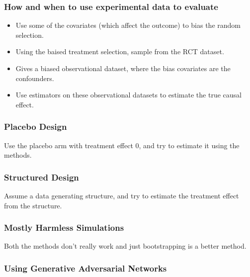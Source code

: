 \documentclass{beamer}
\begin{document}
\begin{frame}
	\frametitle{How and when to use experimental data to evaluate}
	\begin{itemize}
		\item Use some of the covariates (which affect the outcome) to bias the random
			selection.
		\item Using the baised treatment selection, sample from the RCT dataset.
		\item Gives a biased observational dataset, where the bias covariates are the 
			confounders.
		\item Use estimators on these observational datasets to estimate the true 
			causal effect.
	\end{itemize}
\end{frame}

\begin{frame}
	\frametitle{Placebo Design}
	Use the placebo arm with treatment effect 0, and try to estimate it using the methods.
\end{frame}

\begin{frame}
	\frametitle{Structured Design}
	Assume a data generating structure, and try to estimate the treatment effect from the structure.
\end{frame}

\begin{frame}
	\frametitle{Mostly Harmless Simulations}
	Both the methods don't really work and just bootstrapping is a better method.
\end{frame}

\begin{frame}
	\frametitle{Using Generative Adversarial Networks}

\end{frame}
\end{document}

